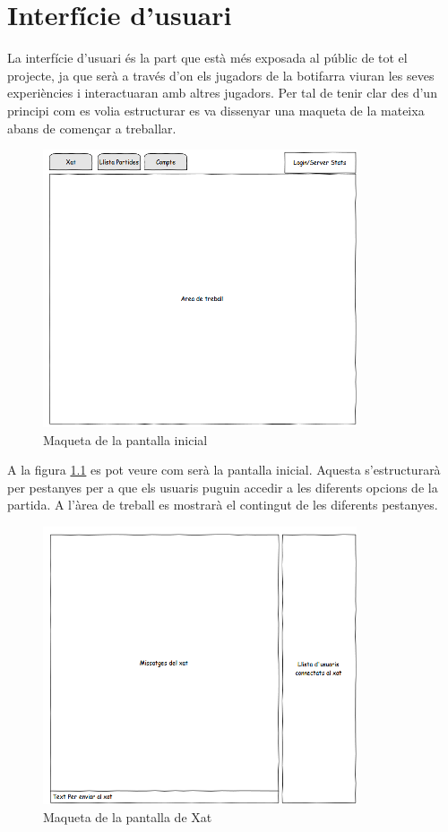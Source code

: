 \chapter{Interfície d'usuari}
\label{chap:interficie_usuari}

La interfície d'usuari és la part que està més exposada al públic de tot el projecte, ja que serà a través d'on els jugadors de la botifarra viuran les seves experiències i interactuaran amb altres jugadors. Per tal de tenir clar des d'un principi com es volia estructurar es va dissenyar una maqueta de la mateixa abans de començar a treballar. 

\begin{figure}[htbp]
\centering\includegraphics{img/Inici.png}
\caption{Maqueta de la pantalla inicial}
\label{fig:mookup-inici}
\end{figure} 

A la figura \ref{fig:mookup-inici} es pot veure com serà la pantalla inicial. Aquesta s'estructurarà per pestanyes per a que els usuaris puguin accedir a les diferents opcions de la partida. A l'àrea de treball es mostrarà el contingut de les diferents pestanyes. 

\begin{figure}[htbp]
\centering\includegraphics{img/Xat.png}
\caption{Maqueta de la pantalla de Xat}
\label{fig:mookup-xat}
\end{figure} 

